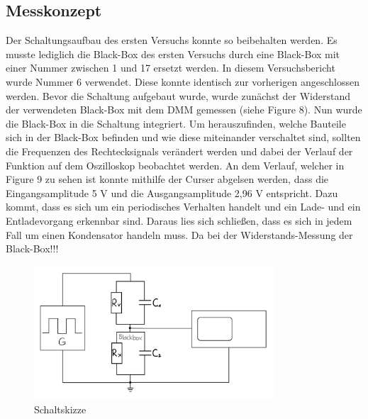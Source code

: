 \documentclass[a4paper,12pt]{article}
\begin{document}
\subsection{Messkonzept}
Der Schaltungsaufbau des ersten Versuchs konnte so beibehalten werden. Es musste lediglich die Black-Box des ersten Versuchs durch eine Black-Box mit einer Nummer zwischen 1 und 17 ersetzt werden. In diesem Versuchsbericht wurde Nummer 6 verwendet. Diese konnte identisch zur vorherigen angeschlossen werden. Bevor die Schaltung aufgebaut wurde, wurde zunächst der Widerstand der verwendeten Black-Box mit dem DMM gemessen (siehe Figure 8). Nun wurde die Black-Box in die Schaltung integriert. Um herauszufinden, welche Bauteile sich in der Black-Box befinden und wie diese miteinander verschaltet sind, sollten die Frequenzen des Rechtecksignals verändert werden und dabei der Verlauf der Funktion auf dem Oszilloskop beobachtet werden. An dem Verlauf, welcher in Figure 9 zu sehen ist konnte mithilfe der Curser abgelsen werden, dass die Eingangsamplitude 5 V und die Ausgangsamplitude 2,96 V entspricht. Dazu kommt, dass es sich um ein periodisches Verhalten handelt und ein Lade- und ein Entladevorgang erkennbar sind. Daraus lies sich schließen, dass es sich in jedem Fall um einen Kondensator handeln muss. Da bei der Widerstands-Messung der Black-Box!!!

\begin{figure}[H]
    \centering
    \includegraphics[width=0.8\textwidth]{../Quellen/Labor2/SkizzeVerschaltungWiderstandKondensatorVersuch2.jpeg}
\caption{Schaltskizze}
\end{figure}
\end{document}
